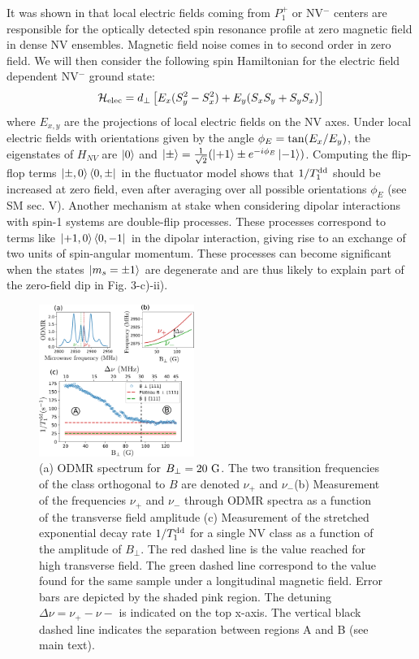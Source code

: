 \documentclass[preprintnumbers,amsmath,amssymb,superscriptaddress,twocolumn,showpacs]{revtex4-2}
\begin{document}
It was shown in  \cite{mittiga2018imaging} that local electric fields coming from $P_1^+$ or NV$^-$ centers are responsible for the optically detected spin resonance profile at zero magnetic field in dense NV ensembles. Magnetic field noise comes in to second order in zero field. 
We will then consider the following spin Hamiltonian for the electric field dependent NV$^-$ ground state: 
\begin{equation}
\label{NV Hamiltonian}
\mathcal{H}_{\rm elec}= d_\perp \left[ E_x(S_y^2-S_x^2) + E_y(S_xS_y+S_yS_x) \right]
\end{equation}
where $E_{x,y}$ are the projections of local electric fields on the NV axes. 
Under local electric fields with orientations given by the angle $\phi_E={\rm tan}(E_x/E_y)$, the eigenstates of $H_{NV}$ are $\ket{0}$ and $\ket{\pm}=\frac{1}{\sqrt{2}}(\ket{+1}\pm e^{-i\phi_E}\ket{-1})$.
Computing the flip-flop terms $\ket{\pm,0} \bra{0,\pm} $ in the fluctuator model shows that $1/T_1^{\rm dd}$ should be increased at zero field, even after averaging over all possible orientations $\phi_E$ (see SM sec. V).  Another mechanism at stake when considering dipolar interactions with spin-1 systems are double-flip processes. 
These processes correspond to terms like $\ket{+1,0} \bra{0,-1}$ in the dipolar interaction, giving rise to an exchange of two units of spin-angular momentum. These processes can become significant when the states $\ket{m_s=\pm 1}$ are degenerate and are thus likely to explain part of the zero-field dip in Fig. 3-c)-ii). 

\begin{figure}
\includegraphics[width=0.45\textwidth]{fig_transverse_field_V3.pdf}
\caption{(a) ODMR spectrum for $B_\perp=20\ \rm G$. The two transition frequencies of the class orthogonal to $B$ are denoted $\nu_+$ and $\nu_-$(b) Measurement of the frequencies $\nu_+$ and $\nu_-$ through ODMR spectra as a function of the transverse field amplitude (c) Measurement of the stretched exponential decay rate $1/T_1^{\rm dd}$ for a single NV class as a function of the amplitude of $B_\perp$. The red dashed line is the value reached for high transverse field. The green dashed line correspond to the value found for the same sample under a longitudinal magnetic field. Error bars are depicted by the shaded pink region. The detuning $\Delta \nu = \nu_+-\nu-$ is indicated on the top x-axis. The vertical black dashed line indicates the separation between regions A and B (see main text).}
\label{B_transverse}
\end{figure}
\end{document}
